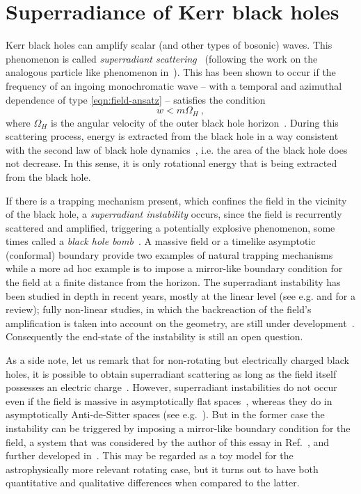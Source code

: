 \section{Superradiance of Kerr black holes}

Kerr black holes can amplify scalar (and other types of bosonic) waves.
This phenomenon is called \textit {superradiant scattering}~\cite{Misner:1972kx} (following the work on the analogous particle like phenomenon in~\cite{Penrose:1969pc,Christodoulou:1970wf}).
This has been shown to occur if the frequency of an ingoing monochromatic wave -- with a temporal and azimuthal dependence of type \eqref{eqn:field-ansatz} -- satisfies the condition 
\begin{equation}
w<m\Omega_H \ , 
\label{super_cond}
\end{equation}
where $\Omega_H$ is the angular velocity of the outer black hole horizon~\cite{Bardeen:1972fi,Starobinsky:1973a,Press:1972zz}.
During this scattering process, energy is extracted from the black hole in a way consistent with the second law of black hole dynamics~\cite{Bardeen:1973gs}, i.e. the area of the black hole does not decrease.
In this sense, it is only rotational energy that is being extracted from the black hole.

If there is a trapping mechanism present, which confines the field in the vicinity of the black hole, a \textit{superradiant instability} occurs, since the field is recurrently scattered and amplified, triggering a potentially explosive phenomenon, some times called a \textit{black hole bomb}~\cite{Press:1972zz}. 
A massive field or a timelike asymptotic (conformal) boundary provide two examples of natural trapping mechanisms while a more ad hoc example is to impose a mirror-like boundary condition for the field at a finite distance from the horizon.
The superradiant instability has been studied in depth in recent years, mostly at the linear level (see e.g. \cite{Dolan:2007mj,Dolan:2012yt} and \cite{Cardoso:2013krh} for a review); fully non-linear studies, in which the backreaction of the field's amplification is taken into account on the geometry, are still under development~\cite{Okawa:2014nda,East:2013mfa}.
Consequently the end-state of the instability is still an open question.

As a side note, let us remark that for non-rotating but electrically charged black holes, it is possible to obtain superradiant scattering as long as the field itself possesses an electric charge~\cite{Bekenstein:1973mi}.
However, superradiant instabilities do not occur even if the field is massive in asymptotically flat spaces~\cite{Hod:2013eea,Hod:2013nn}, whereas they do in asymptotically Anti-de-Sitter spaces (see e.g.~\cite{Wang:2014eha}).
But in the former case the instability can be triggered by imposing a mirror-like boundary condition for the field, a system that was considered by the author of this essay in Ref.~\cite{Herdeiro:2013pia}, and further developed in~\cite{Hod:2013fvl,Degollado:2013bha}.
This may be regarded as a toy model for the astrophysically more relevant rotating case, but it turns out to have both quantitative and qualitative differences when compared to the latter.  

